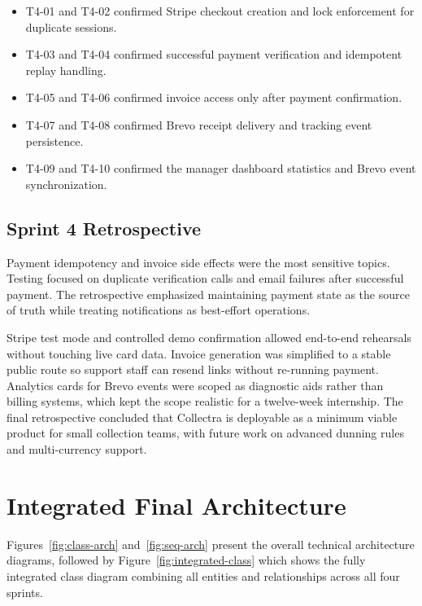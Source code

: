 ﻿\documentclass[12pt,a4paper]{report}
\begin{document}
\begin{itemize}
  \item T4-01 and T4-02 confirmed Stripe checkout creation and lock enforcement for duplicate sessions.
  \item T4-03 and T4-04 confirmed successful payment verification and idempotent replay handling.
  \item T4-05 and T4-06 confirmed invoice access only after payment confirmation.
  \item T4-07 and T4-08 confirmed Brevo receipt delivery and tracking event persistence.
  \item T4-09 and T4-10 confirmed the manager dashboard statistics and Brevo event synchronization.
\end{itemize}

\subsection{Sprint 4 Retrospective}

Payment idempotency and invoice side effects were the most sensitive topics.
Testing focused on duplicate verification calls and email failures after successful payment.
The retrospective emphasized maintaining payment state as the source of truth while treating
notifications as best-effort operations.

Stripe test mode and controlled demo confirmation allowed end-to-end rehearsals without
touching live card data.
Invoice generation was simplified to a stable public route so support staff can resend links
without re-running payment.
Analytics cards for Brevo events were scoped as diagnostic aids rather than billing systems,
which kept the scope realistic for a twelve-week internship.
The final retrospective concluded that Collectra is deployable as a minimum viable product for
small collection teams, with future work on advanced dunning rules and multi-currency support.

\section{Integrated Final Architecture}

Figures~\ref{fig:class-arch} and~\ref{fig:seq-arch} present the overall technical
architecture diagrams, followed by Figure~\ref{fig:integrated-class} which shows
the fully integrated class diagram combining all entities and relationships across
all four sprints.
\end{document}
